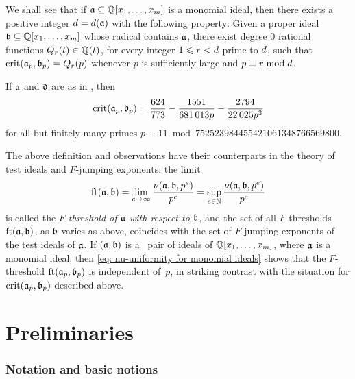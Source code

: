 \documentclass{article}
\begin{document}
We shall see that if $\mathfrak{a} \subseteq \mathbb{Q}[x_1,\ldots,x_m]$ is a monomial ideal, then there exists a positive integer $d = d(\mathfrak{a})$ with the following property:
Given a proper ideal $\mathfrak{b} \subseteq \mathbb{Q}[x_1,\ldots,x_m]$ whose radical contains $\mathfrak{a}$, there exist degree $0$ rational functions $Q_r(t) \in \mathbb{Q}(t)$, for every integer $1 \leqslant r < d$ prime to $d$, such that $\operatorname{crit}(\mathfrak{a}_p, \mathfrak{b}_p) = Q_r(p)$ whenever $p$ is sufficiently large and $p \equiv r \bmod d$.

\begin{example}
   If $\mathfrak{a}$ and $\mathfrak{d}$ are as in , then 
   \[
      \operatorname{crit}(\mathfrak{a}_p,\mathfrak{d}_p) =
      \frac{624}{773} - \frac{\num{1551}}{\num{681013} p} - \frac{\num{2794}}{\num{22025} p^3}
   \]
   for all but finitely many primes $p \equiv 11 \bmod \num{752523984455421061348766569800}$.
\end{example}

The above definition and observations have their counterparts in the theory of test ideals and $F$-jumping exponents: the limit
\[
   \operatorname{ft}(\mathfrak{a}, \mathfrak{b}) = \lim_{e\to \infty} \frac{\nu(\mathfrak{a},\mathfrak{b},p^e)}{p^e}
   = \sup_{e\in \mathbb{N}} \frac{\nu(\mathfrak{a},\mathfrak{b},p^e)}{p^e}
\]
is called the \emph{$F$-threshold of $\mathfrak{a}$ with respect to $\mathfrak{b}$}, and the set of all $F$-thresholds $\operatorname{ft}(\mathfrak{a}, \mathfrak{b})$, as $\mathfrak{b}$ varies as above, coincides with the set of $F$-jumping exponents of the test ideals of $\mathfrak{a}$.
If $(\mathfrak{a},\mathfrak{b})$ is a \compatible\ pair of ideals of  $\mathbb{Q}[x_1,\ldots,x_m]$, where $\mathfrak{a}$ is a monomial ideal, then \eqref{eq: nu-uniformity for monomial ideals} shows that the $F$-threshold $\operatorname{ft}(\mathfrak{a}_p, \mathfrak{b}_p)$ is independent of~$p$, in striking contrast with the situation for $\operatorname{crit}(\mathfrak{a}_p,\mathfrak{b}_p)$ described above.


\newpage

\part{Preliminaries}

\section{Notation and basic notions}
\end{document}
